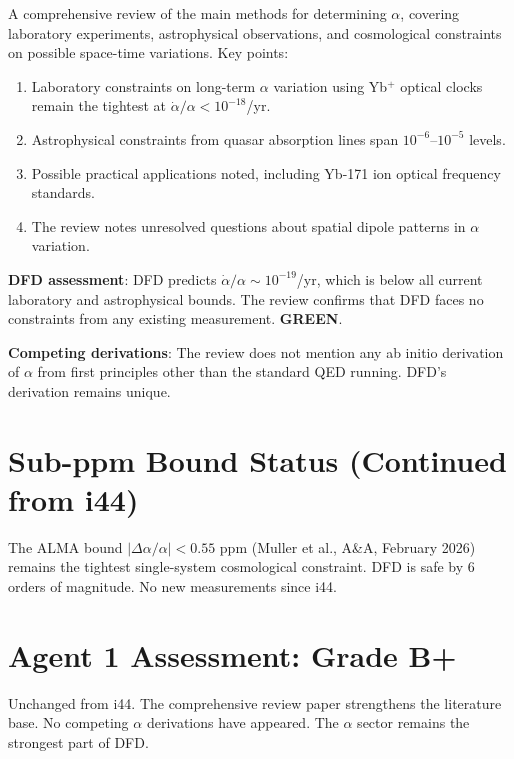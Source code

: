 \documentclass[11pt,a4paper]{article}
\newcommand{\GREEN}{\textcolor{dfdgreen}{\textbf{GREEN}}}
\begin{document}
\begin{tcolorbox}[colback=blue!5!white, colframe=blue!60!black,
  title={arXiv:2506.18328 (June 2025): Review of $\alpha$ Measurement Results and Space-Time Variations}]

A comprehensive review of the main methods for determining $\alpha$, covering laboratory experiments, astrophysical observations, and cosmological constraints on possible space-time variations. Key points:

\begin{enumerate}
\item Laboratory constraints on long-term $\alpha$ variation using Yb$^+$ optical clocks remain the tightest at $\dot{\alpha}/\alpha < 10^{-18}$/yr.
\item Astrophysical constraints from quasar absorption lines span $10^{-6}$--$10^{-5}$ levels.
\item Possible practical applications noted, including Yb-171 ion optical frequency standards.
\item The review notes unresolved questions about spatial dipole patterns in $\alpha$ variation.
\end{enumerate}

\textbf{DFD assessment}: DFD predicts $\dot{\alpha}/\alpha \sim 10^{-19}$/yr, which is below all current laboratory and astrophysical bounds. The review confirms that DFD faces no constraints from any existing measurement. \GREEN.

\textbf{Competing derivations}: The review does not mention any ab initio derivation of $\alpha$ from first principles other than the standard QED running. DFD's derivation remains unique.
\end{tcolorbox}

\section{Sub-ppm Bound Status (Continued from i44)}

The ALMA bound $|\Delta\alpha/\alpha| < 0.55$ ppm (Muller et al., A\&A, February 2026) remains the tightest single-system cosmological constraint. DFD is safe by 6 orders of magnitude. No new measurements since i44.

\section{Agent 1 Assessment: Grade B+}

Unchanged from i44. The comprehensive review paper strengthens the literature base. No competing $\alpha$ derivations have appeared. The $\alpha$ sector remains the strongest part of DFD.
\end{document}
